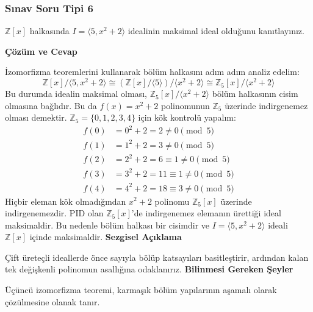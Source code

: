 \documentclass[11pt, a4paper]{article}
\newenvironment{cozum}{
    \vspace{0.5cm}
    \noindent\textcolor{green!60!black}{\faCheckCircle\enspace \textbf{\Large Çözüm ve Cevap}}\par\vspace{0.2cm}
}{}
\newenvironment{sezgisel}{
    \vspace{0.5cm}
    \noindent\textcolor{orange!80!black}{\faLightbulb\enspace \textbf{\Large Sezgisel Açıklama}}\par\vspace{0.2cm}
    \itshape
}{}
\newenvironment{bilgi}{
    \vspace{0.5cm}
    \noindent\textcolor{red!70!black}{\faExclamationTriangle\enspace \textbf{\Large Bilinmesi Gereken Şeyler}}\par\vspace{0.2cm}
}{}
\begin{document}
\subsubsection{Sınav Soru Tipi 6}
\begin{sinavbox}
$\mathbb{Z}[x]$ halkasında $I = \langle 5, x^2+2 \rangle$ idealinin maksimal ideal olduğunu kanıtlayınız.
\end{sinavbox}
\begin{cozum}
İzomorfizma teoremlerini kullanarak bölüm halkasını adım adım analiz edelim:
\[ \mathbb{Z}[x] / \langle 5, x^2+2 \rangle \cong \left( \mathbb{Z}[x] / \langle 5 \rangle \right) / \langle x^2+2 \rangle \cong \mathbb{Z}_5[x] / \langle x^2+2 \rangle \]
Bu durumda idealin maksimal olması, $\mathbb{Z}_5[x] / \langle x^2+2 \rangle$ bölüm halkasının cisim olmasına bağlıdır. Bu da $f(x) = x^2+2$ polinomunun $\mathbb{Z}_5$ üzerinde indirgenemez olması demektir. $\mathbb{Z}_5 = \{0, 1, 2, 3, 4\}$ için kök kontrolü yapalım:
\begin{align*}
f(0) &= 0^2+2 = 2 \neq 0 \pmod 5 \\
f(1) &= 1^2+2 = 3 \neq 0 \pmod 5 \\
f(2) &= 2^2+2 = 6 \equiv 1 \neq 0 \pmod 5 \\
f(3) &= 3^2+2 = 11 \equiv 1 \neq 0 \pmod 5 \\
f(4) &= 4^2+2 = 18 \equiv 3 \neq 0 \pmod 5
\end{align*}
Hiçbir eleman kök olmadığından $x^2+2$ polinomu $\mathbb{Z}_5[x]$ üzerinde indirgenemezdir. PID olan $\mathbb{Z}_5[x]$'de indirgenemez elemanın ürettiği ideal maksimaldir. Bu nedenle bölüm halkası bir cisimdir ve $I = \langle 5, x^2+2 \rangle$ ideali $\mathbb{Z}[x]$ içinde maksimaldir.
\end{cozum}
\begin{sezgisel}
Çift üreteçli ideallerde önce sayıyla bölüp katsayıları basitleştirir, ardından kalan tek değişkenli polinomun asallığına odaklanırız.
\end{sezgisel}
\begin{bilgi}
Üçüncü izomorfizma teoremi, karmaşık bölüm yapılarının aşamalı olarak çözülmesine olanak tanır.
\end{bilgi}

\newpage
\end{document}
